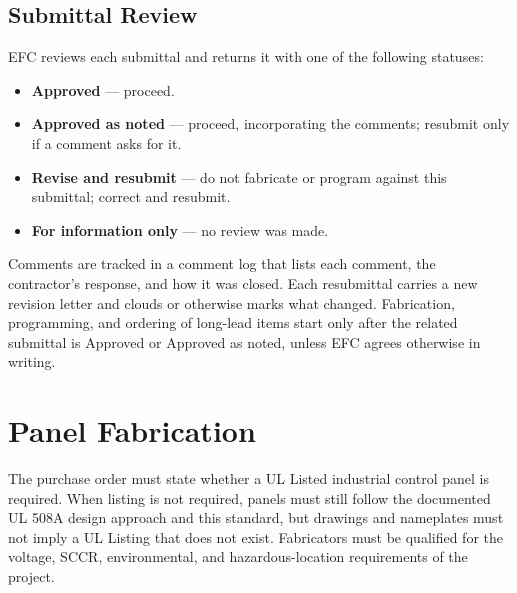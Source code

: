\subsection[Submittal Review]{Submittal Review \newmark}\label{sec:submittal-review}
EFC reviews each submittal and returns it with one of the following statuses:
\begin{itemize}[itemsep=1pt]
  \item \textbf{Approved} --- proceed.
  \item \textbf{Approved as noted} --- proceed, incorporating the comments; resubmit only if a comment asks for it.
  \item \textbf{Revise and resubmit} --- do not fabricate or program against this submittal; correct and resubmit.
  \item \textbf{For information only} --- no review was made.
\end{itemize}
Comments are tracked in a comment log that lists each comment, the contractor's response, and how it was closed. Each resubmittal carries a new revision letter and clouds or otherwise marks what changed. Fabrication, programming, and ordering of long-lead items start only after the related submittal is Approved or Approved as noted, unless EFC agrees otherwise in writing.

\section{Panel Fabrication}
The purchase order must state whether a UL Listed industrial control panel is required. When listing is not required, panels must still follow the documented UL 508A design approach and this standard, but drawings and nameplates must not imply a UL Listing that does not exist. Fabricators must be qualified for the voltage, SCCR, environmental, and hazardous-location requirements of the project.

